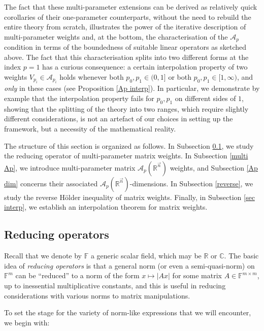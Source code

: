 \documentclass[11pt, reqno]{amsart}
\theoremstyle{definition}
\theoremstyle{remark}
\numberwithin{equation}{section}
\newcommand{\A}{\mathscr A}
\newcommand{\C}{\mathbb C}
\newcommand{\F}{\mathbb F}
\newcommand{\R}{\mathbb R}
\newcommand{\abs}[1]{|#1|}
\begin{document}
The fact that these multi-parameter extensions can be derived as relatively quick corollaries of their one-parameter counterparts, without the need to rebuild the entire theory from scratch, illustrates the power of the iterative description of multi-parameter weights and, at the bottom, the characterisation of the $\A_p$ condition in terms of the boundedness of suitable linear operators as sketched above. The fact that this characterisation splits into two different forms at the index $p=1$ has a curious consequence: a certain interpolation property of two weights $V_{p_i}\in \A_{p_i}$ holds whenever both $p_0,p_1\in(0,1]$ or both $p_0,p_1\in[1,\infty)$, and {\em only} in these cases (see Proposition \ref{Ap interp}). In particular, we demonstrate by example that the interpolation property fails for $p_0,p_1$ on different sides of $1$, showing that the splitting of the theory into two ranges, which require slightly different considerations, is not an artefact of our choices in setting up the framework, but a necessity of the mathematical reality.


The structure of this section is organized as follows.
In Subsection \ref{reducing}, we study
the reducing operator of multi-parameter matrix weights.
In Subsection \ref{multi Ap}, we introduce
multi-parameter matrix $\mathscr A_p(\mathbb R^{\vec n})$ weights,
and Subsection \ref{Ap dim} concerns their associated $\mathscr A_p(\mathbb R^{\vec n})$-dimensions.
In Subsection \ref{reverse}, we study the reverse H\"older inequality of matrix weights.
Finally, in Subsection \ref{sec interp}, we establish an interpolation theorem for matrix weights.

\subsection{Reducing operators} \label{reducing}
Recall that we denote by $\F$ a generic scalar field, which may be $\R$ or $\C$.
The basic idea of {\em reducing operators} is that a general norm (or even a semi-quasi-norm) on $\F^m$ can be ``reduced'' to a norm of the form $x\mapsto\abs{Ax}$ for some matrix $A\in\F^{m\times m}$, up to inessential multiplicative constants, and this is useful in reducing considerations with various norms to matrix manipulations. 

To set the stage for the variety of norm-like expressions that we will encounter, we begin with:
\end{document}
